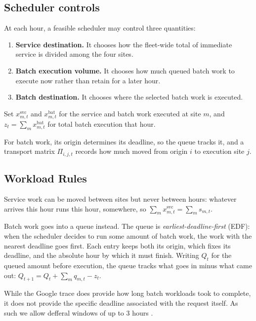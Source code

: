 \documentclass[conference]{IEEEtran}
\begin{document}
\subsection{Scheduler controls}
\label{subsec:problem-decisions}

At each hour, a feasible scheduler may control three quantities:
\begin{enumerate}
  \item \textbf{Service destination.} It chooses how the fleet-wide total of
        immediate service is divided among the four sites.
  \item \textbf{Batch execution volume.} It chooses how much queued batch work
        to execute now rather than retain for a later hour.
  \item \textbf{Batch destination.} It chooses where the selected batch work is
        executed.
\end{enumerate}

Set \(x^{\mathrm{svc}}_{m,t}\) and \(x^{\mathrm{bat}}_{m,t}\) for the service and batch work executed at site \(m\), and \(z_t=\sum_m x^{\mathrm{bat}}_{m,t}\) for total batch execution that hour.

For batch work, its origin determines its deadline, so the queue tracks it, and a transport matrix \(\Pi_{i,j,t}\) records how much moved from origin \(i\) to execution site \(j\).

\subsection{Workload Rules}
\label{subsec:problem-workload-rules}

Service work can be moved between sites but never between hours: whatever arrives this hour runs this hour, somewhere, so \(\sum_m x^{\mathrm{svc}}_{m,t}=\sum_m s_{m,t}\).

Batch work goes into a queue instead. The queue is \emph{earliest-deadline-first} (EDF): when the scheduler decides to run some amount of batch work, the work with the nearest deadline goes first. Each entry keeps both its origin, which fixes its deadline, and the absolute hour by which it must finish. Writing \(Q_t\) for the queued amount before execution, the queue tracks what goes in minus what came out: \(Q_{t+1}=Q_t+\sum_m q_{m,t}-z_t\).

While the Google trace does provide how long batch workloads took to complete, it does not provide the specific deadline associated with the request itself. As such we allow defferal windows of up to 3 hours . 
\end{document}
